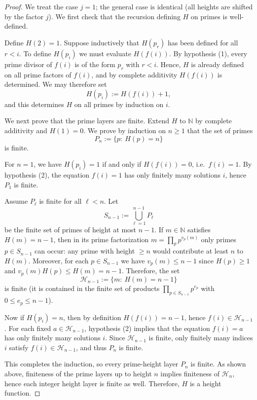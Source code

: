 \documentclass[11pt]{article}
\theoremstyle{definition}
\begin{document}
\begin{proof}
We treat the case $j=1$; the general case is identical (all heights are
shifted by the factor $j$).  We first check that the recursion defining
$H$ on primes is well-defined.

Define $H(2)=1$.  Suppose inductively that $H(p_r)$ has been defined for
all $r<i$.  To define $H(p_i)$ we must evaluate $H(f(i))$.
By hypothesis \textup{(1)}, every prime divisor of $f(i)$ is of the form
$p_r$ with $r<i$.  Hence, $H$ is already defined on all prime factors of
$f(i)$, and by complete additivity $H(f(i))$ is determined.  We may
therefore set
\[
H(p_i):=H(f(i))+1,
\]
and this determines $H$ on all primes by induction on $i$.

We next prove that the prime layers are finite.  Extend $H$ to $\mathbb N$ by complete additivity and $H(1)=0$.
We prove by induction on $n\ge1$ that the set of primes
\[
P_n:=\{p:\ H(p)=n\}
\]
is finite.

For $n=1$, we have $H(p_i)=1$ if and only if $H(f(i))=0$, i.e.\ $f(i)=1$.
By hypothesis \textup{(2)}, the equation $f(i)=1$ has only finitely many
solutions $i$, hence $P_1$ is finite.

Assume $P_\ell$ is finite for all $\ell<n$.  Let
\[
S_{n-1}:=\bigcup_{\ell=1}^{n-1} P_\ell
\]
be the finite set of primes of height at most $n-1$.
If $m\in\mathbb N$ satisfies $H(m)=n-1$, then in its prime factorization
$m=\prod_{p}p^{v_p(m)}$ only primes $p\in S_{n-1}$ can occur: any prime
with height $\ge n$ would contribute at least $n$ to $H(m)$.
Moreover, for each $p\in S_{n-1}$ we have $v_p(m)\le n-1$ since
$H(p)\ge 1$ and $v_p(m)H(p)\le H(m)=n-1$.
Therefore, the set
\[
\mathcal H_{n-1}:=\{m:\ H(m)=n-1\}
\]
is finite (it is contained in the finite set of products
$\prod_{p\in S_{n-1}} p^{e_p}$ with $0\le e_p\le n-1$).

Now if $H(p_i)=n$, then by definition $H(f(i))=n-1$, hence
$f(i)\in\mathcal H_{n-1}$.
For each fixed $a\in\mathcal H_{n-1}$, hypothesis \textup{(2)} implies
that the equation $f(i)=a$ has only finitely many solutions $i$.
Since $\mathcal H_{n-1}$ is finite, only finitely many indices $i$
satisfy $f(i)\in\mathcal H_{n-1}$, and thus $P_n$ is finite.

This completes the induction, so every prime-height layer $P_n$ is
finite.  As shown above, finiteness of the prime layers up to height $n$
implies finiteness of $\mathcal H_n$, hence each integer height layer is
finite as well.  Therefore, $H$ is a height function.
\end{proof}
\end{document}
